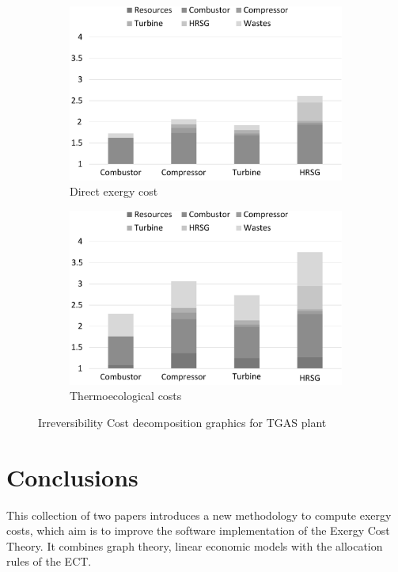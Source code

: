 \documentclass{ecos2018}
\begin{document}
\begin{figure}[htpb]
	\vspace{12pt}
	\begin{subfigure}{0.48\textwidth}
		\includegraphics[width=\textwidth]{tgas_dec}
		\caption{Direct exergy cost}
	\end{subfigure} \hfill
	\begin{subfigure}{0.48\textwidth}
		\includegraphics[width=\textwidth]{tgas_gec}
		\caption{Thermoecological costs}
	\end{subfigure}
	\caption{Irreversibility Cost decomposition graphics for TGAS plant}
	\label{fig2}
\end{figure}

\section{Conclusions}
This collection of two papers introduces a new methodology to compute exergy costs, which aim is to improve the software implementation of the Exergy Cost Theory. It combines graph theory, linear economic models with the allocation rules of the ECT.
\end{document}
